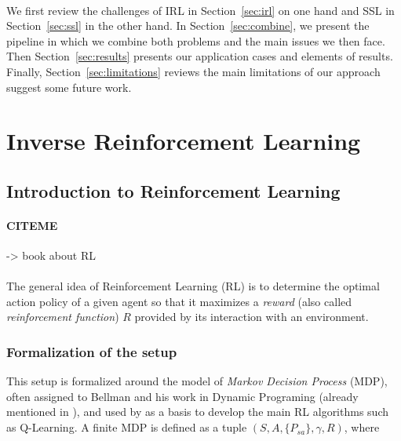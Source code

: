 \documentclass{article}
\begin{document}
\paragraph{}
We first review the challenges of IRL in Section~\ref{sec:irl} on one hand and SSL in Section~\ref{sec:ssl} in the other hand. In Section~\ref{sec:combine}, we present the pipeline in which we combine both problems and the main issues we then face. Then Section~\ref{sec:results} presents our application cases and elements of results. Finally, Section~\ref{sec:limitations} reviews the main limitations of our approach suggest some future work.


\section{Inverse Reinforcement Learning \label{sec:irl}}

\subsection{Introduction to Reinforcement Learning}

\paragraph{CITEME}
\cite{Littman94}
\cite{Sutton98} -> book about RL

\paragraph{}
The general idea of Reinforcement Learning (RL) is to determine the optimal action policy of a given agent so that it maximizes a \emph{reward} (also called \emph{reinforcement function}) $R$ provided by its interaction with an environment.

\subsubsection{Formalization of the setup}

This setup is formalized around the model of \emph{Markov Decision Process} (MDP), often assigned to Bellman and his work in Dynamic Programing (already mentioned in \cite{Bellman57}), and used by \cite{Watkins89} as a basis to develop the main RL algorithms such as Q-Learning. A finite MDP is defined as a tuple $(S,A,\{P_{sa}\},\gamma,R)$, where
\end{document}
